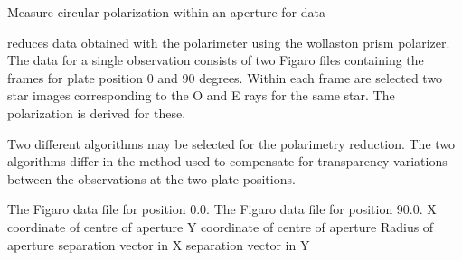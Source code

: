 \begin{manroutinedescription}
        Measure circular polarization within an aperture for {} data

        {} reduces data obtained with the {} {} polarimeter
        using the wollaston  prism polarizer. The data for a
        single observation consists of two Figaro files containing the
        frames for plate position 0 and 90 degrees. Within each
        frame are selected two star images corresponding to the O and E rays
        for the same star. The polarization is derived for these.

        Two different algorithms may be selected for the polarimetry
        reduction. The two algorithms differ in the method used to
        compensate for transparency variations between the observations
        at the two plate positions.


\begin{manparametertable}
     The Figaro data file for %
position 0.0.
     The Figaro data file for %
position 90.0.
  X coordinate of centre of aperture
  Y coordinate of centre of aperture
     Radius of aperture
  {} separation vector %
in X
  {} separation vector %
in Y

\end{manparametertable}
\end{manroutinedescription}
